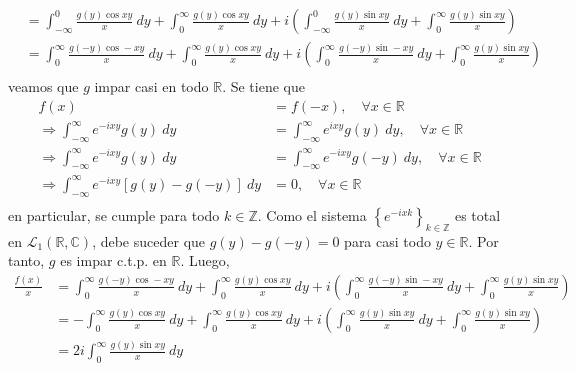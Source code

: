\documentclass[12pt]{report}
\theoremstyle{largebreak}
\begin{document}
\begin{sol}
\begin{equation*}
\begin{split}
                &=\int_{-\infty}^{0}\frac{g(y)\cos xy}{x}\:dy+\int_{0}^{\infty}\frac{g(y)\cos xy}{x}\:dy+i\left(\int_{-\infty}^{0}\frac{g(y)\sin xy}{x}\:dy+\int_{0}^{\infty}\frac{g(y)\sin xy}{x}\right)\\
                &=\int_{0}^{\infty}\frac{g(-y)\cos -xy}{x}\:dy+\int_{0}^{\infty}\frac{g(y)\cos xy}{x}\:dy+i\left(\int_{0}^{\infty}\frac{g(-y)\sin -xy}{x}\:dy+\int_{0}^{\infty}\frac{g(y)\sin xy}{x}\right)\\
            \end{split}
        \end{equation*}
        veamos que $g$ impar casi en todo $\mathbb{R}$. Se tiene que
        \begin{equation*}
            \begin{split}
                f(x)&=f(-x),\quad\forall x\in\mathbb{R}\\
                \Rightarrow \int_{-\infty}^{\infty}e^{ -ixy}g(y)\:dy&=\int_{-\infty}^{\infty}e^{ ixy}g(y)\:dy,\quad\forall x\in\mathbb{R}\\
                \Rightarrow \int_{-\infty}^{\infty}e^{ -ixy}g(y)\:dy&=\int_{-\infty}^{\infty}e^{-ixy}g(-y)\:dy,\quad\forall x\in\mathbb{R}\\
                \Rightarrow \int_{-\infty}^{\infty}e^{ -ixy}\left[g(y)-g(-y)\right]\:dy&=0,\quad\forall x\in\mathbb{R}\\
            \end{split}
        \end{equation*}
        en particular, se cumple para todo $k\in\mathbb{Z}$. Como el sistema $\left\{e^{ -ixk} \right\}_{k\in\mathbb{Z}}$ es total en $\mathcal{L}_1(\mathbb{R},\mathbb{C})$, debe suceder que $g(y)-g(-y)=0$ para casi todo $y\in\mathbb{R}$. Por tanto, $g$ es impar c.t.p. en $\mathbb{R}$. Luego,
        \begin{equation*}
            \begin{split}
                \frac{f(x)}{x}&=\int_{0}^{\infty}\frac{g(-y)\cos -xy}{x}\:dy+\int_{0}^{\infty}\frac{g(y)\cos xy}{x}\:dy+i\left(\int_{0}^{\infty}\frac{g(-y)\sin -xy}{x}\:dy+\int_{0}^{\infty}\frac{g(y)\sin xy}{x}\right)\\
                &=-\int_{0}^{\infty}\frac{g(y)\cos xy}{x}\:dy+\int_{0}^{\infty}\frac{g(y)\cos xy}{x}\:dy+i\left(\int_{0}^{\infty}\frac{g(y)\sin xy}{x}\:dy+\int_{0}^{\infty}\frac{g(y)\sin xy}{x}\right)\\
                &=2i\int_{0}^{\infty}\frac{g(y)\sin xy}{x}\:dy\\

\end{split}
\end{equation*}
\end{sol}
\end{document}
